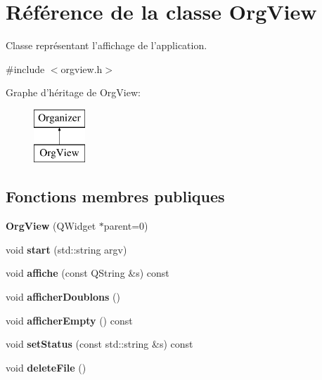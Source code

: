 \hypertarget{class_org_view}{\section{Référence de la classe Org\-View}
\label{class_org_view}
}


Classe représentant l'affichage de l'application.  




{\ttfamily \#include $<$orgview.\-h$>$}

Graphe d'héritage de Org\-View\-:\begin{figure}[H]
\begin{center}
\leavevmode
\includegraphics[height=2.000000cm]{class_org_view}
\end{center}
\end{figure}
\subsection*{Fonctions membres publiques}
\begin{DoxyCompactItemize}
\item 
\hypertarget{class_org_view_ab246039c316ff51bd026ce921f00ea55}{{\bfseries Org\-View} (Q\-Widget $\ast$parent=0)}\label{class_org_view_ab246039c316ff51bd026ce921f00ea55}

\item 
\hypertarget{class_org_view_a618029b070b1d60a49fe0696eb5be20c}{void {\bfseries start} (std\-::string argv)}\label{class_org_view_a618029b070b1d60a49fe0696eb5be20c}

\item 
\hypertarget{class_org_view_a1b58721da984696fdb169f647870291d}{void {\bfseries affiche} (const Q\-String \&s) const }\label{class_org_view_a1b58721da984696fdb169f647870291d}

\item 
\hypertarget{class_org_view_a966ec26e20729e28a7acb677f87cda75}{void {\bfseries afficher\-Doublons} ()}\label{class_org_view_a966ec26e20729e28a7acb677f87cda75}

\item 
\hypertarget{class_org_view_adc93fbb911e7a96847bbd00cc7183a42}{void {\bfseries afficher\-Empty} () const }\label{class_org_view_adc93fbb911e7a96847bbd00cc7183a42}

\item 
\hypertarget{class_org_view_a327ad745c797b4f746c79d77fc153525}{void {\bfseries set\-Status} (const std\-::string \&s) const }\label{class_org_view_a327ad745c797b4f746c79d77fc153525}

\item 
\hypertarget{class_org_view_a76cd92af0cd2b4c2b7c1de215e1b4536}{void {\bfseries delete\-File} ()}\label{class_org_view_a76cd92af0cd2b4c2b7c1de215e1b4536}

\end{DoxyCompactItemize}
